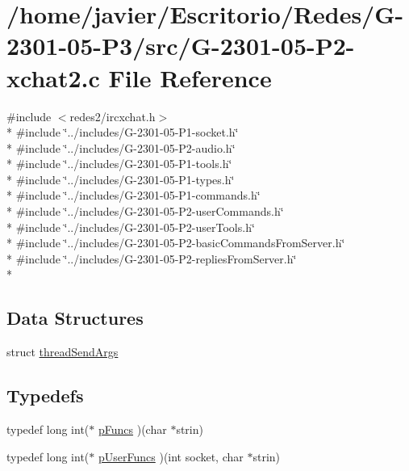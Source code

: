 \hypertarget{_g-2301-05-_p2-xchat2_8c}{\section{/home/javier/\-Escritorio/\-Redes/\-G-\/2301-\/05-\/\-P3/src/\-G-\/2301-\/05-\/\-P2-\/xchat2.c File Reference}
\label{_g-2301-05-_p2-xchat2_8c}
}
{\ttfamily \#include $<$redes2/ircxchat.\-h$>$}\\*
{\ttfamily \#include \char`\"{}../includes/\-G-\/2301-\/05-\/\-P1-\/socket.\-h\char`\"{}}\\*
{\ttfamily \#include \char`\"{}../includes/\-G-\/2301-\/05-\/\-P2-\/audio.\-h\char`\"{}}\\*
{\ttfamily \#include \char`\"{}../includes/\-G-\/2301-\/05-\/\-P1-\/tools.\-h\char`\"{}}\\*
{\ttfamily \#include \char`\"{}../includes/\-G-\/2301-\/05-\/\-P1-\/types.\-h\char`\"{}}\\*
{\ttfamily \#include \char`\"{}../includes/\-G-\/2301-\/05-\/\-P1-\/commands.\-h\char`\"{}}\\*
{\ttfamily \#include \char`\"{}../includes/\-G-\/2301-\/05-\/\-P2-\/user\-Commands.\-h\char`\"{}}\\*
{\ttfamily \#include \char`\"{}../includes/\-G-\/2301-\/05-\/\-P2-\/user\-Tools.\-h\char`\"{}}\\*
{\ttfamily \#include \char`\"{}../includes/\-G-\/2301-\/05-\/\-P2-\/basic\-Commands\-From\-Server.\-h\char`\"{}}\\*
{\ttfamily \#include \char`\"{}../includes/\-G-\/2301-\/05-\/\-P2-\/replies\-From\-Server.\-h\char`\"{}}\\*
\subsection*{Data Structures}
\begin{DoxyCompactItemize}
\item 
struct \hyperlink{structthread_send_args}{thread\-Send\-Args}
\end{DoxyCompactItemize}
\subsection*{Typedefs}
\begin{DoxyCompactItemize}
\item 
typedef long int($\ast$ \hyperlink{_g-2301-05-_p2-xchat2_8c_a4b932f95396d02e0a0c48dfab971852a}{p\-Funcs} )(char $\ast$strin)
\item 
typedef long int($\ast$ \hyperlink{_g-2301-05-_p2-xchat2_8c_aa0f4db7da8ca28c8ec5521d8825a83ea}{p\-User\-Funcs} )(int socket, char $\ast$strin)
\end{DoxyCompactItemize}
